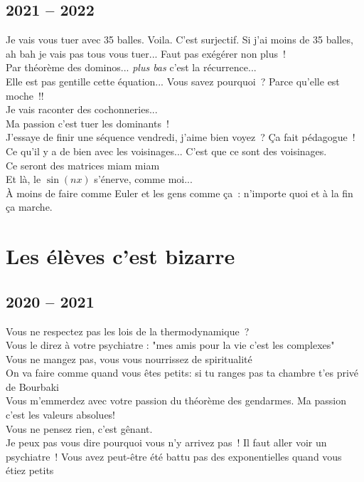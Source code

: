\documentclass[french, a4paper, openany]{book}
\begin{document}
	\subsection*{2021 -- 2022}
		\noindent \og Je vais vous tuer avec 35 balles. Voila. C'est surjectif. Si j'ai moins de 35 balles, ah bah je vais pas tous vous tuer... Faut pas exégérer non plus~! \fg \\
		\og Par théorème des dominos... \emph{plus bas} c'est la récurrence... \fg \\
		\og Elle est pas gentille cette équation... Vous savez pourquoi~? Parce qu'elle est moche~!! \fg \\
		\og Je vais raconter des cochonneries... \fg \\
		\og Ma passion c'est tuer les dominants~! \fg \\
		\og J'essaye de finir une séquence vendredi, j'aime bien voyez~? Ça fait pédagogue~! \fg \\
		\og Ce qu'il y a de bien avec les voisinages... C'est que ce sont des voisinages. \fg \\
		\og Ce seront des matrices miam miam \fg \\
		\og Et là, le $\sin (nx)$ s'énerve, comme moi... \fg \\
		\og À moins de faire comme Euler et les gens comme ça~: n'importe quoi et à la fin ça marche. \fg \\

\section*{Les élèves c'est bizarre}

	\subsection*{2020 -- 2021}
		\noindent \og Vous ne respectez pas les lois de la thermodynamique~? \fg \\
		\og Vous le direz à votre psychiatre : "mes amis pour la vie c'est les complexes" \fg \\
		\og Vous ne mangez pas, vous vous nourrissez de spiritualité \fg \\
		\og On va faire comme quand vous êtes petits: si tu ranges pas ta chambre t'es privé de Bourbaki \fg \\
		\og Vous m'emmerdez avec votre passion du théorème des gendarmes. Ma passion c'est les valeurs absolues! \fg \\
		\og Vous ne pensez rien, c'est gênant. \fg \\
		\og Je peux pas vous dire pourquoi vous n'y arrivez pas~! Il faut aller voir un psychiatre~! Vous avez peut-être été battu pas des exponentielles quand vous étiez petits \fg \\
	
\end{document}
